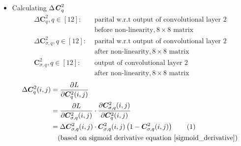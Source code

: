 \documentclass[12pt]{article}
\newcommand\numberthis{\stepcounter{equation}\tag{\theequation}}
\begin{document}
\begin{itemize}
\item Calculating $\Delta \textbf{\textit{C}}_{q}^2$
\begin{align*}
    \Delta \bm{C}_{q}^2, q \in [12]:& \text{ parital w.r.t output of convolutional layer 2} \\& \text{ before non-linearity}, 8 \times 8 \text{ matrix}\\
    \Delta \bm{C}_{\sigma, q}^2, q \in [12]:& \text{ parital w.r.t output of convolutional layer 2} \\& \text{ after non-linearity}, 8 \times 8 \text{ matrix}\\
    \bm{C}_{\sigma, q}^2, q \in [12]:& \text{ output of convolutional layer 2} \\& \text{ after non-linearity}, 8 \times 8 \text{ matrix}
\end{align*}
\begin{align*}
    \Delta \bm{C}_{q}^2(i, j)
    &= \frac{\partial L}{\partial \bm{C}_{q}^2(i, j)}
    \\
    &= \frac{\partial L}{\partial \bm{C}_{\sigma, q}^2(i, j)}
    \cdot
    \frac{\partial \bm{C}_{\sigma, q}^2(i, j)}{\partial \bm{C}_{q}^2(i, j)}
    \\
    &= \Delta \bm{C}_{\sigma, q}^2(i, j)
    \cdot
    \bm{C}_{\sigma, q}^2(i, j)\left(1 - \bm{C}_{\sigma, q}^2(i, j)\right)
    \numberthis \label{delta_C2}
    \\
    &\quad (\text{based on sigmoid derivative equation } \eqref{sigmoid_derivative})
\end{align*}


\end{itemize}
\end{document}
